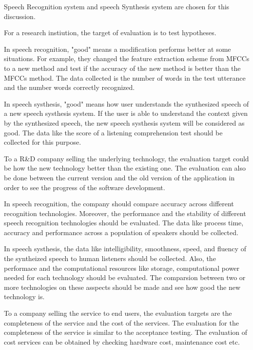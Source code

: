 \documentclass[12pt]{article}
\newenvironment{problem}[2][Problem]{\begin{trivlist}
\item[\hskip \labelsep {\bfseries #1}\hskip \labelsep {\bfseries #2.}]}{\end{trivlist}}
\begin{document}
\begin{problem}{5.2}
    Speech Recognition system and speech Synthesis system are chosen for this
    discussion.

    For a research instiution, the target of evaluation is to test hypotheses.

    In speech recognition, "good" means a modification performs better at some situations.
    For example, they changed the feature extraction scheme from MFCCs to a new method
    and test if the accuracy of the new method is better than the MFCCs method.
    The data collected is the number of words in the test utterance and
    the number words correctly recognized.

    In speech systhesis, "good" means how user understands the synthesized speech
    of a new speech systhesis system.
    If the user is able to understand the context given by the synthesized speech, the
    new speech systhesis system will be considered as good.
    The data like the score of a listening comprehension test should be collected
    for this purpose.

    To a R\&D company selling the underlying technology, the evaluation
    target could be how the new technology better than the existing one. The 
    evaluation can also be done between the current version and the old version of 
    the application in order to see the progress of the software development.

    In speech recognition, the company should compare accuracy across different 
    recognition technologies. Moreover, the performance and the stability of different 
    speech recognition technologies should be evaluated. The data like process time,
    accuracy and performance across a population of speakers should be collected.

    In speech systhesis, the data like intelligibility, smoothness, speed, and 
    fluency of the syntheized speech to human listeners should be collected. 
    Also, the performace and the computational resources like storage, computational
    power needed for each technology should be evaluated.
    The comparsion between two or more technologies on these asspects should be 
    made and see how good the new technology is.

    To a company selling the service to end users, the evaluation targets are 
    the completeness of the service and the cost of the services. 
    The evaluation for the completeness of the service is similar to the 
    acceptance testing. The evaluation of cost services can be obtained by 
    checking hardware cost, maintenance cost etc.


\end{problem}
\end{document}

